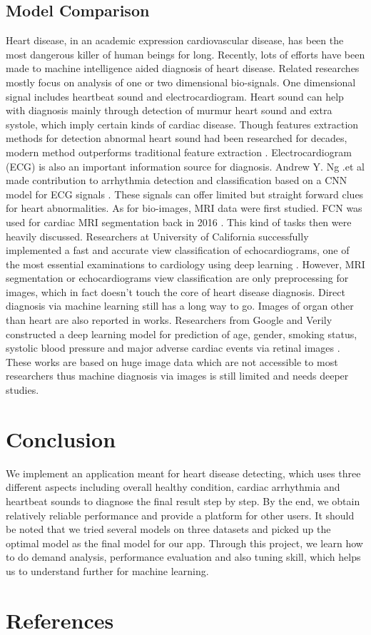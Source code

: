 \documentclass[letterpaper]{article} %
\begin{document}
\subsection{Model Comparison}

Heart disease, in an academic expression cardiovascular disease, has been the most dangerous killer of human beings for long. Recently, lots of efforts have been made to machine intelligence aided diagnosis of heart disease. Related researches mostly focus on analysis of one or two dimensional bio-signals. One dimensional signal includes heartbeat sound and electrocardiogram. Heart sound can help with diagnosis mainly through detection of murmur heart sound and extra systole, which imply certain kinds of cardiac disease. Though features extraction methods for detection abnormal heart sound had been researched for decades, modern method outperforms traditional feature extraction \cite{cite1}. Electrocardiogram (ECG) is also an important information source for diagnosis. Andrew Y. Ng .et al made contribution to arrhythmia detection and classification based on a CNN model for ECG signals \cite{cite2}. These signals can offer limited but straight forward clues for heart abnormalities. As for bio-images, MRI data were first studied. FCN was used for cardiac MRI segmentation back in 2016 \cite{cite3}. This kind of tasks then were heavily discussed. Researchers at University of California successfully implemented a fast and accurate view classification of echocardiograms, one of the most essential examinations to cardiology using deep learning \cite{cite4}. However, MRI segmentation or echocardiograms view classification are only preprocessing for images, which in fact doesn’t touch the core of heart disease diagnosis. Direct diagnosis via machine learning still has a long way to go. Images of organ other than heart are also reported in works. Researchers from Google and Verily constructed a deep learning model for prediction of age, gender, smoking status, systolic blood pressure and major adverse cardiac events via retinal images \cite{cite5}. These works are based on huge image data which are not accessible to most researchers thus machine diagnosis via images is still limited and needs deeper studies.

\section{Conclusion}

We implement an application meant for heart disease detecting, which uses three different aspects including overall healthy condition, cardiac arrhythmia and heartbeat sounds to diagnose the final result step by step. By the end, we obtain relatively reliable performance and provide a platform for other users. It should be noted that we tried several  models on three datasets and picked up the optimal model as the final model for our app. Through this project, we learn how to do demand analysis, performance evaluation and also tuning skill, which helps us to understand further for machine learning.

\section{References}
\end{document}

